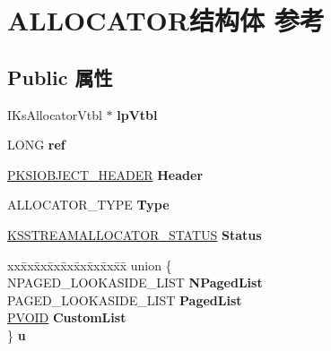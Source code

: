 \hypertarget{struct_a_l_l_o_c_a_t_o_r}{}\section{A\+L\+L\+O\+C\+A\+T\+O\+R结构体 参考}
\label{struct_a_l_l_o_c_a_t_o_r}
\subsection*{Public 属性}
\begin{DoxyCompactItemize}
\item 
\mbox{\label{struct_a_l_l_o_c_a_t_o_r_adfeadf9367f91069ef64d5553b0f490b}} 
I\+Ks\+Allocator\+Vtbl $\ast$ {\bfseries lp\+Vtbl}
\item 
\mbox{\label{struct_a_l_l_o_c_a_t_o_r_a4c5398ec653d91386e04cb93a3dc2a10}} 
L\+O\+NG {\bfseries ref}
\item 
\mbox{\label{struct_a_l_l_o_c_a_t_o_r_aa90120193aa7461c9f2004236821a667}} 
\hyperlink{struct_k_s_i_o_b_j_e_c_t___h_e_a_d_e_r}{P\+K\+S\+I\+O\+B\+J\+E\+C\+T\+\_\+\+H\+E\+A\+D\+ER} {\bfseries Header}
\item 
\mbox{\label{struct_a_l_l_o_c_a_t_o_r_a94388b0b062f9ef8c7d0d9f1363a72bf}} 
A\+L\+L\+O\+C\+A\+T\+O\+R\+\_\+\+T\+Y\+PE {\bfseries Type}
\item 
\mbox{\label{struct_a_l_l_o_c_a_t_o_r_a377fb8916c8749ba03cfe1e736a6d373}} 
\hyperlink{struct_k_s_s_t_r_e_a_m_a_l_l_o_c_a_t_o_r___s_t_a_t_u_s}{K\+S\+S\+T\+R\+E\+A\+M\+A\+L\+L\+O\+C\+A\+T\+O\+R\+\_\+\+S\+T\+A\+T\+US} {\bfseries Status}
\item 
\mbox{\label{struct_a_l_l_o_c_a_t_o_r_a5cde0ded9ae6f9a4da518aac6240f948}} 
\begin{tabbing}
xx\=xx\=xx\=xx\=xx\=xx\=xx\=xx\=xx\=\kill
union \{\\
\>NPAGED\_LOOKASIDE\_LIST {\bfseries NPagedList}\\
\>PAGED\_LOOKASIDE\_LIST {\bfseries PagedList}\\
\>\hyperlink{interfacevoid}{PVOID} {\bfseries CustomList}\\
\} {\bfseries u}\\


\end{tabbing}
\end{DoxyCompactItemize}
